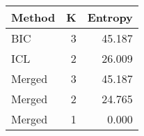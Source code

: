 \begin{center} 
\begin{tabular}{lrr}
 Method & K & Entropy \\ 
  \hline
\hline
BIC &    3 & 45.187 \\ 
  ICL &    2 & 26.009 \\ 
  Merged &    3 & 45.187 \\ 
  Merged &    2 & 24.765 \\ 
  Merged &    1 & 0.000 \\ 
  \end{tabular}
\end{center} 
